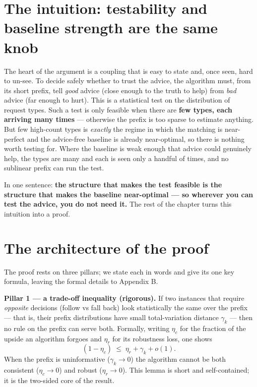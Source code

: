 \section{The intuition: testability and baseline strength are the same
knob}

The heart of the argument is a coupling that is easy to state and, once
seen, hard to un-see. To decide safely whether to trust the advice, the
algorithm must, from its short prefix, tell \emph{good} advice (close
enough to the truth to help) from \emph{bad} advice (far enough to
hurt). This is a statistical test on the distribution of request types.
Such a test is only feasible when there are \textbf{few types, each
arriving many times} --- otherwise the prefix is too sparse to estimate
anything. But few high-count types is \emph{exactly} the regime in which
the matching is near-perfect and the advice-free baseline is already
near-optimal, so there is nothing worth testing for. Where the baseline
is weak enough that advice could genuinely help, the types are many and
each is seen only a handful of times, and no sublinear prefix can run
the test.

In one sentence: \textbf{the structure that makes the test feasible is
the structure that makes the baseline near-optimal --- so wherever you
can test the advice, you do not need it.} The rest of the chapter turns
this intuition into a proof.

\section{The architecture of the
proof}

The proof rests on three pillars; we state each in words and give its
one key formula, leaving the formal details to Appendix B.

\textbf{Pillar 1 --- a trade-off inequality (rigorous).} If two
instances that require \emph{opposite} decisions (follow vs fall back)
look statistically the same over the prefix --- that is, their prefix
distributions have small total-variation distance \(\gamma_k\) --- then
no rule on the prefix can serve both. Formally, writing \(\eta_c\) for
the fraction of the upside an algorithm forgoes and \(\eta_r\) for its
robustness loss, one shows \[(1-\eta_c)\;\le\;\eta_r+\gamma_k+o(1).\]
When the prefix is uninformative (\(\gamma_k\to0\)) the algorithm cannot
be both consistent (\(\eta_c\to0\)) and robust (\(\eta_r\to0\)). This
lemma is short and self-contained; it is the two-sided core of the
result.


